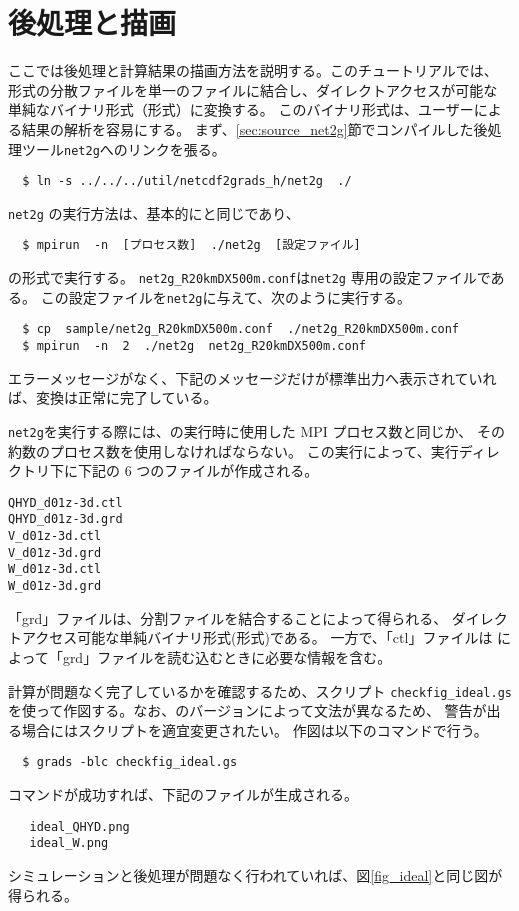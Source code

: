 \section{後処理と描画} \label{sec:ideal_exp_net2g}
ここでは後処理と計算結果の描画方法を説明する。このチュートリアルでは、
{\netcdf}形式の分散ファイルを単一のファイルに結合し、ダイレクトアクセスが可能な
単純なバイナリ形式（\grads 形式）に変換する。
このバイナリ形式は、ユーザーによる結果の解析を容易にする。
まず、\ref{sec:source_net2g}節でコンパイルした後処理ツール\verb|net2g|へのリンクを張る。
\begin{verbatim}
  $ ln -s ../../../util/netcdf2grads_h/net2g  ./
\end{verbatim}

\verb|net2g| の実行方法は、基本的に{\scalerm}と同じであり、
\begin{verbatim}
  $ mpirun  -n  [プロセス数]  ./net2g  [設定ファイル]
\end{verbatim}
の形式で実行する。
\verb|net2g_R20kmDX500m.conf|は\verb|net2g| 専用の設定ファイルである。
この設定ファイルを\verb|net2g|に与えて、次のように実行する。
\begin{verbatim}
  $ cp  sample/net2g_R20kmDX500m.conf  ./net2g_R20kmDX500m.conf
  $ mpirun  -n  2  ./net2g  net2g_R20kmDX500m.conf
\end{verbatim}
エラーメッセージがなく、下記のメッセージだけが標準出力へ表示されていれば、変換は正常に完了している。

\verb|net2g|を実行する際には、{\scalerm}の実行時に使用した MPI プロセス数と同じか、
その約数のプロセス数を使用しなければならない。
この実行によって、実行ディレクトリ下に下記の 6 つのファイルが作成される。
\begin{alltt}
  QHYD_d01z-3d.ctl
  QHYD_d01z-3d.grd
  V_d01z-3d.ctl
  V_d01z-3d.grd
  W_d01z-3d.ctl
  W_d01z-3d.grd
\end{alltt}
「grd」ファイルは、分割ファイルを結合することによって得られる、
ダイレクトアクセス可能な単純バイナリ形式(\grads 形式)である。
一方で、「ctl」ファイルは \grads によって「grd」ファイルを読む込むときに必要な情報を含む。

計算が問題なく完了しているかを確認するため、\grads スクリプト \verb|checkfig_ideal.gs|
を使って作図する。なお、\grads のバージョンによって文法が異なるため、
警告が出る場合には\grads スクリプトを適宜変更されたい。
作図は以下のコマンドで行う。
\begin{verbatim}
  $ grads -blc checkfig_ideal.gs
\end{verbatim}
コマンドが成功すれば、下記のファイルが生成される。
\begin{verbatim}
   ideal_QHYD.png
   ideal_W.png
\end{verbatim}
シミュレーションと後処理が問題なく行われていれば、図\ref{fig_ideal}と同じ図が得られる。

